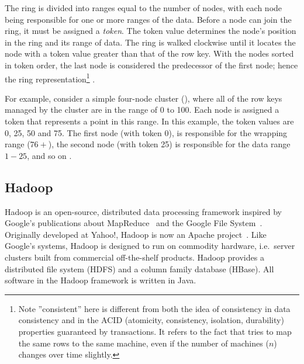 The ring is divided into ranges equal to the number of nodes, with each node being responsible for one or more ranges of the data. Before a node can join the ring, it must be assigned a \textit{token}. The token value determines the node's position in the ring and its range of data. The ring is walked clockwise until it locates the node with a token value greater than that of the row key. %
With the nodes sorted in token order, the last node is considered the predecessor of the first node; hence the ring representation\footnote{Note ''consistent'' here is different from both the idea of consistency in data consistency and in the ACID (atomicity, consistency, isolation, durability) properties guaranteed by transactions. It refers to the fact that tries to map the same rows to the same machine, even if the number of machines ($n$) changes over time slightly.} \cite{CassandraPartitioning}.

For example, consider a simple four-node cluster (), where all of the row keys managed by the cluster are in the range of 0 to 100. Each node is assigned a token that represents a point in this range. In this example, the token values are 0, 25, 50 and 75. The first node (with token 0), is responsible for the wrapping range ($76+$), the second node (with token 25) is responsible for the data range $1-25$, and so on %
\cite{CassandraPartitioning}.


 
\subsection{Hadoop}

Hadoop is an open-source, distributed data processing framework inspired by Google's publications about MapReduce~\cite{Dean:2008:MSD:1327452.1327492} and the Google File System~\cite{Ghemawat:2003:GFS:945445.945450}. Originally developed at Yahoo!, Hadoop is now an Apache project~\cite{Hadoop}. Like Google's systems, Hadoop is designed to run on commodity hardware, i.e.\ server clusters built from commercial off-the-shelf products. Hadoop provides a distributed file system (HDFS) and a column family database (HBase). All software in the Hadoop framework is written in Java.

